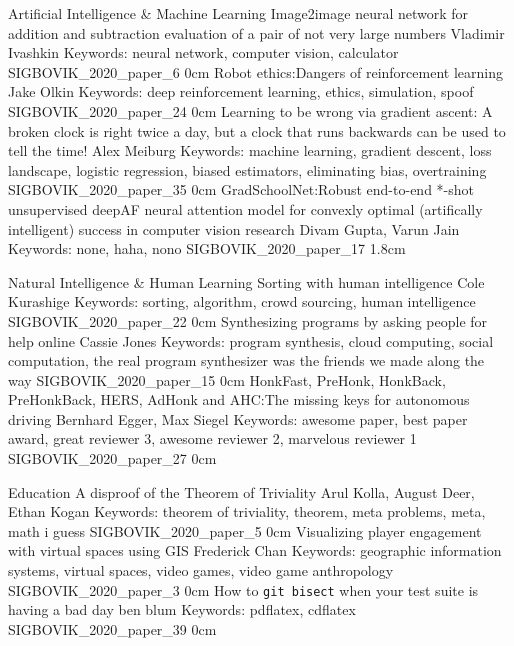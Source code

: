\addtrack
	{}{Artificial Intelligence \& Machine Learning}
\addpaper
	{Image2image neural network for addition and subtraction evaluation of a pair of not very large numbers}
	{Vladimir Ivashkin}
	{Keywords: neural network, computer vision, calculator}
	{SIGBOVIK_2020_paper_6}
	{0cm}
	{}
\addpaper
	{Robot ethics:\@ Dangers of reinforcement learning}
	{Jake Olkin}
	{Keywords: deep reinforcement learning, ethics, simulation, spoof}
	{SIGBOVIK_2020_paper_24}
	{0cm}
	{}
\addpaper
	{Learning to be wrong via gradient ascent: A broken clock is right twice a day, but a clock that runs backwards can be used to tell the time!}
	{Alex Meiburg}
	{Keywords: machine learning, gradient descent, loss landscape, logistic regression, biased estimators, eliminating bias, overtraining}
	{SIGBOVIK_2020_paper_35}
	{0cm}
	{}
\addpaper
	{GradSchoolNet:\@ Robust end-to-end *-shot unsupervised deepAF neural attention model for convexly optimal (artifically intelligent) success in computer vision research}
	{Divam Gupta, Varun Jain}
	{Keywords: none, haha, nono}
	{SIGBOVIK_2020_paper_17}
	{1.8cm}
	{}

\addtrack
	{}{Natural Intelligence \& Human Learning}
\addpaper
	{Sorting with human intelligence}
	{Cole Kurashige}
	{Keywords: sorting, algorithm, crowd sourcing, human intelligence}
	{SIGBOVIK_2020_paper_22}
	{0cm}
	{}
\addpaper
	{Synthesizing programs by asking people for help online}
	{Cassie Jones}
	{Keywords: program synthesis, cloud computing, social computation, the real program synthesizer was the friends we made along the way}
	{SIGBOVIK_2020_paper_15}
	{0cm}
	{}
\addpaper
	{HonkFast, PreHonk, HonkBack, PreHonkBack, HERS, AdHonk and AHC:\@ The missing keys for autonomous driving}
	{Bernhard Egger, Max Siegel}
	{Keywords: awesome paper, best paper award, great reviewer 3, awesome reviewer 2, marvelous reviewer 1}
	{SIGBOVIK_2020_paper_27}
	{0cm}
	{}

\addtrack
	{}{Education}
\addpaper
	{A disproof of the Theorem of Triviality}
	{Arul Kolla, August Deer, Ethan Kogan}
	{Keywords: theorem of triviality, theorem, meta problems, meta, math i guess}
	{SIGBOVIK_2020_paper_5}
	{0cm}
	{}
\addpaper
	{Visualizing player engagement with virtual spaces using GIS}
	{Frederick Chan}
	{Keywords: geographic information systems, virtual spaces, video games, video game anthropology}
	{SIGBOVIK_2020_paper_3}
	{0cm}
	{}
\addpaper
	{How to \texttt{git bisect} when your test suite is having a bad day}
	{ben blum}
	{Keywords: pdflatex, cdflatex}
	{SIGBOVIK_2020_paper_39}
	{0cm}
	{}

